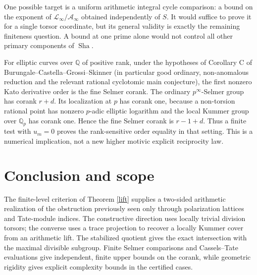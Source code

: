 \documentclass[11pt,a4paper]{article}
\theoremstyle{remark}\newtheorem{remark}[theorem]{Remark}
\newcommand{\Sha}{\mathop{\mathrm{Sha}}}\newcommand{\Pic}{\operatorname{Pic}}\newcommand{\Br}{\operatorname{Br}}\newcommand{\NS}{\operatorname{NS}}\newcommand{\Gal}{\operatorname{Gal}}\newcommand{\Hom}{\operatorname{Hom}}\newcommand{\Z}{\mathbb Z}\newcommand{\Q}{\mathbb Q}\newcommand{\F}{\mathbb F}\newcommand{\G}{\mathbb G}\newcommand{\coker}{\operatorname{coker}}\newcommand{\loc}{\operatorname{loc}}\newcommand{\et}{\mathrm{\acute et}}\newcommand{\Div}{\operatorname{Div}}\newcommand{\ord}{\operatorname{ord}}\newcommand{\im}{\operatorname{im}}\newcommand{\diag}{\operatorname{diag}}\newcommand{\rank}{\operatorname{rank}}\newcommand{\Sel}{\operatorname{Sel}}
\begin{document}
One possible target is a uniform arithmetic integral cycle comparison: a bound on the exponent of $\mathcal L_\infty/\mathcal A_\infty$ obtained independently of $S$. It would suffice to prove it for a single torsor coordinate, but its general validity is exactly the remaining finiteness question. A bound at one prime alone would not control all other primary components of $\Sha$.

For elliptic curves over $\Q$ of positive rank, under the hypotheses of Corollary C of Burungale--Castella--Grossi--Skinner \cite{bcgs} (in particular good ordinary, non-anomalous reduction and the relevant rational cyclotomic main conjecture), the first nonzero Kato derivative order is the fine Selmer corank. The ordinary $p^\infty$-Selmer group has corank $r+d$. Its localization at $p$ has corank one, because a non-torsion rational point has nonzero $p$-adic elliptic logarithm and the local Kummer group over $\Q_p$ has corank one. Hence the fine Selmer corank is $r-1+d$. Thus a finite test with $u_m=0$ proves the rank-sensitive order equality in that setting. This is a numerical implication, not a new higher motivic explicit reciprocity law.

\section{Conclusion and scope}
The finite-level criterion of Theorem \ref{lift} supplies a two-sided arithmetic realization of the obstruction previously seen only through polarization lattices and Tate-module indices. The constructive direction uses locally trivial division torsors; the converse uses a trace projection to recover a locally Kummer cover from an arithmetic lift. The stabilized quotient gives the exact intersection with the maximal divisible subgroup. Finite Selmer comparisons and Cassels--Tate evaluations give independent, finite upper bounds on the corank, while geometric rigidity gives explicit complexity bounds in the certified cases.
\end{document}
